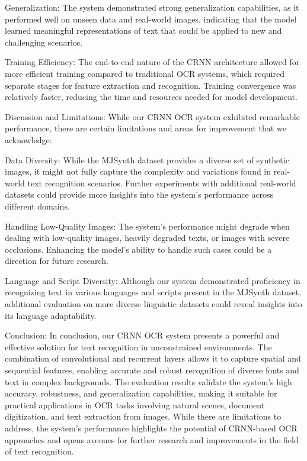 \documentclass[10pt,twocolumn,letterpaper]{article}
\begin{document}
    Generalization:
    The system demonstrated strong generalization capabilities, as it performed well on unseen data and real-world images, indicating that the model learned meaningful representations of text that could be applied to new and challenging scenarios.

    Training Efficiency:
    The end-to-end nature of the CRNN architecture allowed for more efficient training compared to traditional OCR systems, which required separate stages for feature extraction and recognition. Training convergence was relatively faster, reducing the time and resources needed for model development.

Discussion and Limitations:
While our CRNN OCR system exhibited remarkable performance, there are certain limitations and areas for improvement that we acknowledge:

    Data Diversity:
    While the MJSynth dataset provides a diverse set of synthetic images, it might not fully capture the complexity and variations found in real-world text recognition scenarios. Further experiments with additional real-world datasets could provide more insights into the system's performance across different domains.

    Handling Low-Quality Images:
    The system's performance might degrade when dealing with low-quality images, heavily degraded texts, or images with severe occlusions. Enhancing the model's ability to handle such cases could be a direction for future research.

    Language and Script Diversity:
    Although our system demonstrated proficiency in recognizing text in various languages and scripts present in the MJSynth dataset, additional evaluation on more diverse linguistic datasets could reveal insights into its language adaptability.

Conclusion:
In conclusion, our CRNN OCR system presents a powerful and effective solution for text recognition in unconstrained environments. The combination of convolutional and recurrent layers allows it to capture spatial and sequential features, enabling accurate and robust recognition of diverse fonts and text in complex backgrounds. The evaluation results validate the system's high accuracy, robustness, and generalization capabilities, making it suitable for practical applications in OCR tasks involving natural scenes, document digitization, and text extraction from images. While there are limitations to address, the system's performance highlights the potential of CRNN-based OCR approaches and opens avenues for further research and improvements in the field of text recognition.
\end{document}
